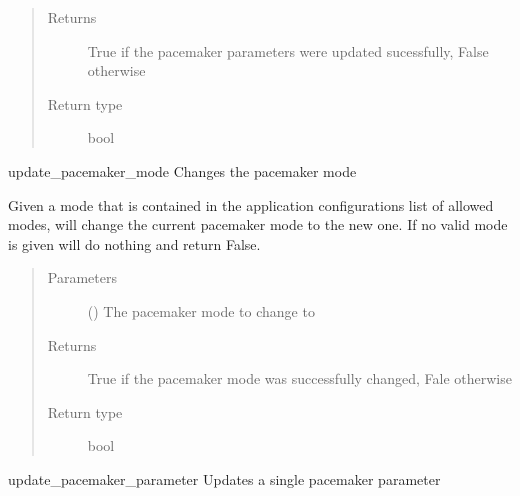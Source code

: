 \documentclass[letterpaper,10pt,english]{sphinxmanual}
\begin{document}
\begin{fulllineitems}
\begin{fulllineitems}
\begin{quote}
\begin{description}
\item[{Returns}] \leavevmode
True if the pacemaker parameters were updated sucessfully, False otherwise

\item[{Return type}] \leavevmode
bool

\end{description}\end{quote}

\end{fulllineitems}


\begin{fulllineitems}
\label{\detokenize{index:data.user.User.update_pacemaker_mode}}
update\_pacemaker\_mode Changes the pacemaker mode

Given a mode that is contained in the application
configurations list of allowed modes, will change
the current pacemaker mode to the new one. If no
valid mode is given will do nothing and return
False.
\begin{quote}\begin{description}
\item[{Parameters}] \leavevmode
{} () \textendash{} The pacemaker mode to change to

\item[{Returns}] \leavevmode
True if the pacemaker mode was successfully changed, Fale otherwise

\item[{Return type}] \leavevmode
bool

\end{description}\end{quote}

\end{fulllineitems}


\begin{fulllineitems}
\label{\detokenize{index:data.user.User.update_pacemaker_parameter}}
update\_pacemaker\_parameter Updates a single pacemaker parameter


\end{fulllineitems}
\end{fulllineitems}
\end{document}
